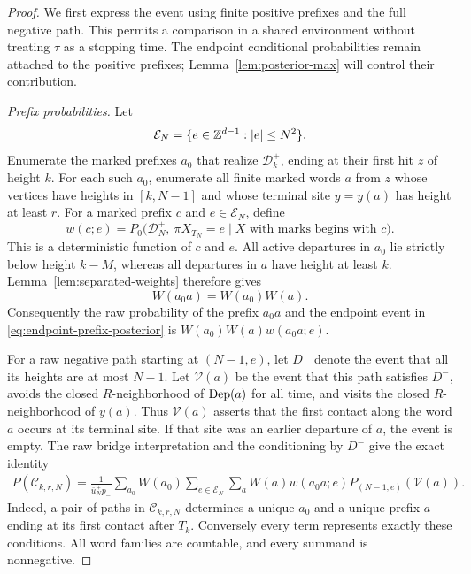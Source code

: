 \begin{proof}
We first express the event using finite positive prefixes and the full
negative path.  This permits a comparison in a shared environment
without treating \(\tau\) as a stopping time.  The endpoint
conditional probabilities remain attached to the positive prefixes;
Lemma~\ref{lem:posterior-max} will control their contribution.

\emph{Prefix probabilities.}
Let
\[
 \mathcal E_N=\{e\in\mathbb Z^{d-1}:|e|\le N^2\}.
\]
Enumerate the marked prefixes \(a_0\) that realize
\(\mathcal D_k^+\), ending at their first hit \(z\) of height \(k\).
For each such \(a_0\), enumerate all finite marked words \(a\) from
\(z\) whose vertices have heights in \([k,N-1]\) and whose terminal
site \(y=y(a)\) has height at least \(r\).
For a marked prefix \(c\) and \(e\in\mathcal E_N\), define
\begin{equation}\label{eq:endpoint-prefix-posterior}
 w(c;e)=P_0\bigl(\mathcal D_N^+,\ \pi X_{T_N}=e
                  \mid X\text{ with marks begins with }c\bigr).
\end{equation}
This is a deterministic function of \(c\) and \(e\).
All active departures in \(a_0\) lie strictly below height \(k-M\),
whereas all departures in \(a\) have height at least \(k\).
Lemma~\ref{lem:separated-weights} therefore gives
\[
 W(a_0a)=W(a_0)W(a).
\]
Consequently the raw probability of the prefix \(a_0a\) and the
endpoint event in \eqref{eq:endpoint-prefix-posterior} is
\(W(a_0)W(a)w(a_0a;e)\).

For a raw negative path starting at \((N-1,e)\), let \(D^-\) denote
the event that all its heights are at most \(N-1\).
Let \(\mathcal V(a)\) be the event that this path satisfies \(D^-\),
avoids the closed \(R\)-neighborhood of \(\operatorname{Dep}(a)\) for all time,
and visits the closed \(R\)-neighborhood of \(y(a)\).
Thus \(\mathcal V(a)\) asserts that the first contact along the word
\(a\) occurs at its terminal site.  If that site was an earlier
departure of \(a\), the event is empty.
The raw bridge interpretation and the conditioning by \(D^-\) give
the exact identity
\begin{equation}\label{eq:first-contact-prefix-sum}
 \begin{split}
 P(\mathcal C_{k,r,N})
 =\frac1{\bar u_N^+p_-}
 \sum_{a_0}W(a_0)
 \sum_{e\in\mathcal E_N}\sum_a
 W(a)w(a_0a;e)P_{(N-1,e)}(\mathcal V(a)).
 \end{split}
\end{equation}
Indeed, a pair of paths in \(\mathcal C_{k,r,N}\) determines a unique
\(a_0\) and a unique prefix \(a\) ending at its first contact after
\(T_k\).  Conversely every term represents exactly these conditions.
All word families are countable, and every summand is nonnegative.


\end{proof}

